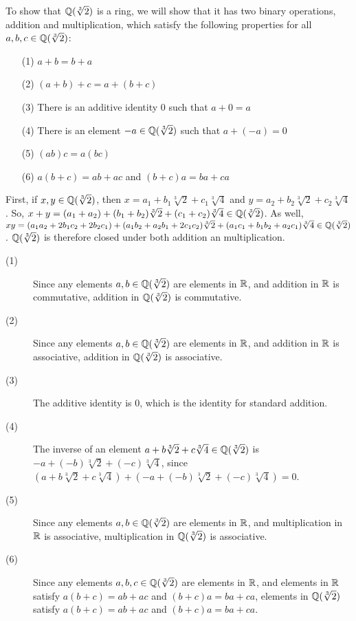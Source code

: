 \documentclass{hmwk}
\begin{document}
\begin{solution}
To show that $\mathbb{Q}(\sqrt[3]{2})$ is a ring, we will show that it has two binary operations, addition and multiplication, which satisfy the following properties for all $a, b, c \in \mathbb{Q}(\sqrt[3]{2})$:

\begin{itemize}
    \item[(1)] $a + b = b + a$ 
    \item[(2)] $(a + b) + c = a + (b + c)$
    \item[(3)] There is an additive identity $0$ such that $a + 0 = a$
    \item[(4)] There is an element $-a \in \mathbb{Q}(\sqrt[3]{2})$ such that $a + (-a) = 0$
    \item[(5)] $(ab)c = a(bc)$
    \item[(6)] $a(b + c) = ab + ac$ and $(b + c)a = ba + ca$
\end{itemize}

First, if $x, y \in \mathbb{Q}(\sqrt[3]{2})$, then $x = a_1 + b_1\sqrt[3]{2} + c_1\sqrt[3]{4}$ and $y = a_2 + b_2\sqrt[3]{2} + c_2\sqrt[3]{4}$. So, $x + y = (a_1 + a_2) + (b_1 + b_2)\sqrt[3]{2} + (c_1 + c_2)\sqrt[3]{4} \in \mathbb{Q}(\sqrt[3]{2})$. As well, $xy = (a_1a_2 + 2b_1c_2 + 2b_2c_1) + (a_1b_2 + a_2b_1 + 2c_1c_2)\sqrt[3]{2} + (a_1c_1 + b_1b_2 + a_2c_1)\sqrt[3]{4} \in \mathbb{Q}(\sqrt[3]{2})$. $\mathbb{Q}(\sqrt[3]{2})$ is therefore closed under both addition an multiplication.

\begin{description}
    \item[(1)] Since any elements $a, b \in \mathbb{Q}(\sqrt[3]{2})$ are elements in $\mathbb{R}$, and addition in $\mathbb{R}$ is commutative, addition in $\mathbb{Q}(\sqrt[3]{2})$ is commutative.
    \item[(2)] Since any elements $a, b \in \mathbb{Q}(\sqrt[3]{2})$ are elements in $\mathbb{R}$, and addition in $\mathbb{R}$ is associative, addition in $\mathbb{Q}(\sqrt[3]{2})$ is associative.
    \item[(3)] The additive identity is $0$, which is the identity for standard addition.
    \item[(4)] The inverse of an element $a + b\sqrt[3]{2} + c\sqrt[3]{4} \in \mathbb{Q}(\sqrt[3]{2})$ is $-a + (-b)\sqrt[3]{2} + (-c)\sqrt[3]{4}$, since $(a + b\sqrt[3]{2} + c\sqrt[3]{4}) + (-a + (-b)\sqrt[3]{2} + (-c)\sqrt[3]{4}) = 0$.
    \item[(5)] Since any elements $a, b \in \mathbb{Q}(\sqrt[3]{2})$ are elements in $\mathbb{R}$, and multiplication in $\mathbb{R}$ is associative, multiplication in $\mathbb{Q}(\sqrt[3]{2})$ is associative.
    \item[(6)] Since any elements $a, b, c \in \mathbb{Q}(\sqrt[3]{2})$ are elements in $\mathbb{R}$, and elements in $\mathbb{R}$ satisfy $a(b+c) = ab+ac$ and $(b+c)a = ba + ca$, elements in $\mathbb{Q}(\sqrt[3]{2})$ satisfy $a(b+c) = ab+ac$ and $(b+c)a = ba + ca$.
\end{description}
\end{solution}
\end{document}
